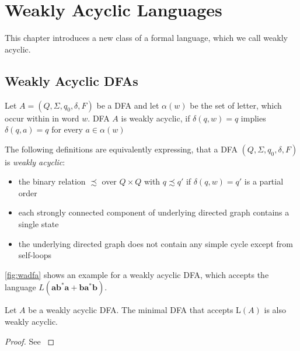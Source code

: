 \chapter{Weakly Acyclic Languages}\label{chapter:weakly_acyclic_language}

This chapter introduces a new class of a formal language, which we call weakly acyclic. 

\section{Weakly Acyclic DFAs}\label{sec:weakly_acyclic_dfa}

\begin{definition}
Let $A = (Q, \Sigma, q_{0},\delta,F)$ be a DFA and let $\alpha(w)$ be the set of letter, which occur within in word $w$. DFA $A$ is weakly acyclic, if $\delta(q,w) = q$ implies $\delta(q,a) = q$ for every $a \in \alpha(w)$
\end{definition}

The following definitions are equivalently expressing, that a DFA $(Q, \Sigma, q_{0},\delta,F)$ is \textit{weakly acyclic}:
\begin{itemize}[--,noitemsep]
	\item the binary relation $\precsim $  over $Q \times Q$ with $q \precsim q'$ if $\delta(q,w) = q'$ is a partial order
	\item each strongly connected component of underlying directed graph contains a single state 
	\item the underlying directed graph does not contain any simple cycle except from self-loops
\end{itemize}

\autoref{fig:wadfa} shows an example for a weakly acyclic DFA, which accepts the language $L(\bm{ab^{*}a + ba^{*}b})$.

\begin{lemma}\label{lem:minimal}
Let $A$ be a weakly acyclic DFA. The minimal DFA that accepts L$(A)$ is also weakly acyclic. 
\end{lemma}

\begin{proof}
See {\cite[Proposition~4]{blondin_24}}
\end{proof}

